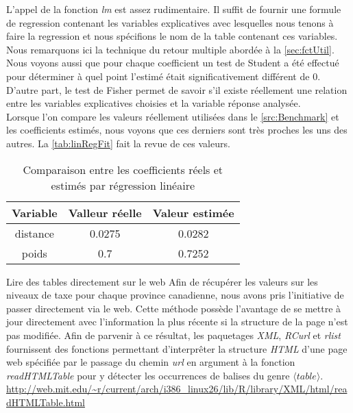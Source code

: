 \vspace{\baselineskip}
\noindent
L'appel de la fonction \emph{lm} est assez rudimentaire. Il suffit de fournir une formule de regression contenant les variables explicatives avec lesquelles nous tenons à faire la regression et nous spécifions le nom de la table contenant ces variables. Nous remarquons ici la technique du retour multiple abordée à la \autoref{sec:fctUtil}. Nous voyons aussi que pour chaque coefficient un test de Student a été effectué pour déterminer à quel point l'estimé était significativement différent de 0. D'autre part, le test de Fisher permet de savoir s'il existe réellement une relation entre les variables explicatives choisies et la variable réponse analysée. \cite{outputLM} \\

\noindent
Lorsque l'on compare les valeurs réellement utilisées dans le \autoref{src:Benchmark} et les coefficients estimés, nous voyons que ces derniers sont très proches les uns des autres. La \autoref{tab:linRegFit} fait la revue de ces valeurs. \\

\begin{table}[h]
	\centering
	\begin{tabular}{ccc}
		\textbf{Variable} & \textbf{Valleur réelle} & \textbf{Valeur estimée} \\
		\hline
		distance & 0.0275 & 0.0282 \\
		poids & 0.7 & 0.7252		
	\end{tabular}
	\caption{Comparaison entre les coefficients réels et estimés par régression linéaire}
	\label{tab:linRegFit}
\end{table}

\begin{moreInfo}{Lire des tables directement sur le web}
	Afin de récupérer les valeurs sur les niveaux de taxe pour chaque province canadienne, nous avons pris l'initiative de passer directement via le web. Cette méthode possède l'avantage de se mettre à jour directement avec l'information la plus récente si la structure de la page n'est pas modifiée. Afin de parvenir à ce résultat, les paquetages \emph{XML}, \emph{RCurl} et \emph{rlist} fournissent des fonctions permettant d'interprêter la structure \emph{HTML} d'une page web spécifiée par le passage du chemin \emph{url} en argument à la fonction \emph{readHTMLTable} pour y détecter les occurrences de balises du genre $\langle table \rangle$. \\
	\url{http://web.mit.edu/~r/current/arch/i386_linux26/lib/R/library/XML/html/readHTMLTable.html}
\end{moreInfo}
